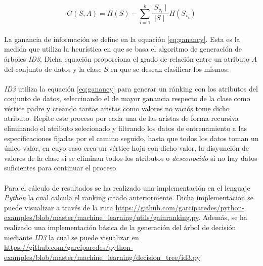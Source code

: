 \documentclass[10pt, a4paper,spanish]{article}
\begin{document}
		\begin{equation}
			\label{eq:ganancy}
			G(S, A) = H(S) - \sum_{i=1}^k \frac{\mid S_{v_i} \mid }{ \mid S \mid }H(S_{v_i})
		\end{equation}

		\paragraph{}
		La ganancia de información se define en la equación \eqref{eq:ganancy}. Esta es la medida que utiliza la heurística en que se basa el algoritmo de generación de árboles \emph{ID3}. Dicha equación proporciona el grado de relación entre un atributo $A$ del conjunto de datos y la clase $S$ en que se desean clasificar los mismos.

		\paragraph{}

		\begin{algorithm}
			\emph{ID3} utiliza la equación \eqref{eq:ganancy} para generar un ránking con los atributos del conjunto de datos, seleccinando el de mayor ganancia respecto de la clase como vértice padre y creando tantas aristas como valores no vaciós tome dicho atributo. Repite este proceso por cada una de las aristas de forma recursiva eliminando el atributo selecionado y filtrando los datos de entrenamiento a las especificaciones fijadas por el camino seguido, hasta que todos los datos toman un único valor, en cuyo caso crea un vértice hoja con dicho valor, la disyunción de valores de la clase si se eliminan todos los atributos o \emph{desconocido} si no hay datos suficientes para continuar el proceso
		\end{algorithm}

		\paragraph{}
		Para el cálculo de resultados se ha realizado una implementación en el lenguaje \emph{Python} la cual calcula el ranking citado anteriormente. Dicha implementación se puede visualizar a través de la ruta \url{https://github.com/garciparedes/python-examples/blob/master/machine_learning/utils/gainranking.py}\cite{github:garciparedes-python-examples}. Además, se ha realizado una implementación básica de la generación del árbol de decisión mediante \emph{ID3} la cual se puede visualizar en \url{https://github.com/garciparedes/python-examples/blob/master/machine_learning/decision_tree/id3.py}\cite{github:garciparedes-python-examples}
\end{document}
